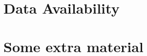 \documentclass[fleqn,usenatbib]{mnras}
\begin{document}
\section*{Data Availability}










\appendix

\section{Some extra material}



\bsp	%
\label{lastpage}
\end{document}
